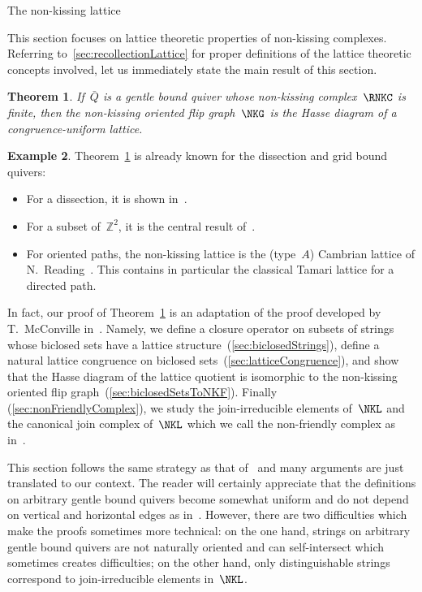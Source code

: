 \documentclass{amsart}
\makeatletter
\newtheorem{theorem}{Theorem}[part]
\theoremstyle{definition}
\newtheorem{example}[theorem]{Example}
\newcommand{\Z}{\mathbb{Z}} %
\def\part{\@startsection{part}{1}%
\z@{.7\linespacing\@plus\linespacing}{.8\linespacing}%
{\LARGE\sffamily\centering}}
\makeatother
\begin{document}

\clearpage
\part{The non-kissing lattice}
\label{part:lattice}

This section focuses on lattice theoretic properties of non-kissing complexes.
Referring to~\ref{sec:recollectionLattice} for proper definitions of the lattice theoretic concepts involved, let us immediately state the main result of this section.

\begin{theorem}
\label{thm:lattice}
If~$\bar Q$ is a gentle bound quiver whose non-kissing complex~$\RNKC$ is finite, then the non-kissing oriented flip graph~$\NKG$ is the Hasse diagram of a congruence-uniform lattice.
\end{theorem}

\begin{example}
Theorem~\ref{thm:lattice} is already known for the dissection and grid bound quivers:
\begin{itemize}
\item For a dissection, it is shown in~\cite{GarverMcConville}.
\item For a subset of~$\Z^2$,  it is the central result of~\cite{McConville}.
\item For oriented paths, the non-kissing lattice is the (type~$A$) Cambrian lattice of N.~Reading~\cite{Reading-CambrianLattices}. This contains in particular the classical Tamari lattice for a directed path.
\end{itemize}
\end{example}

In fact, our proof of Theorem~\ref{thm:lattice} is an adaptation of the proof  developed by T.~McConville in~\cite{McConville}.
Namely, we define a closure operator on subsets of strings whose biclosed sets have a lattice structure~(\ref{sec:biclosedStrings}), define a natural lattice congruence on biclosed sets~(\ref{sec:latticeCongruence}), and show that the Hasse diagram of the lattice quotient is isomorphic to the non-kissing oriented flip graph~(\ref{sec:biclosedSetsToNKF}).
Finally (\ref{sec:nonFriendlyComplex}), we study the join-irreducible elements of~$\NKL$ and the canonical join complex of~$\NKL$ which we call the non-friendly complex as in~\cite{GarverMcConville-grid}.

This section follows the same strategy as that of~\cite{McConville, GarverMcConville-grid} and many arguments are just translated to our context.
The reader will certainly appreciate that the definitions on arbitrary gentle bound quivers become somewhat uniform and do not depend on vertical and horizontal edges as in~\cite{McConville}.
However, there are two difficulties which make the proofs sometimes more technical: on the one hand, strings on arbitrary gentle bound quivers are not naturally oriented and can self-intersect which sometimes creates difficulties; on the other hand, only distinguishable strings correspond to join-irreducible elements in~$\NKL$.
\end{document}
